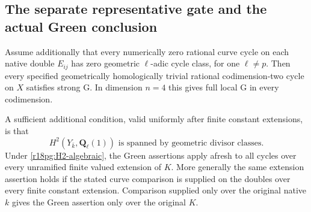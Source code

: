 \subsection{The separate representative gate and the actual Green conclusion}

\begin{corollary}
\label{r18pg:green}
Assume additionally that every numerically zero rational curve cycle
on each native double $E_{ij}$ has zero geometric $\ell$-adic cycle
class, for one $\ell\ne p$.  Then every specified geometrically
homologically trivial rational codimension-two cycle on $X$ satisfies
strong G.  In dimension $n=4$ this gives full local G in every
codimension.

A sufficient additional condition, valid uniformly after finite
constant extensions, is that
\[
     H^2(Y_{\bar k},\mathbf Q_\ell(1))
          \text{ is spanned by geometric divisor classes}.
 \tag{PG18.19}\label{r18pg:H2-algebraic}
\]
Under \eqref{r18pg:H2-algebraic}, the Green assertions apply afresh
to all cycles over every unramified finite valued extension of $K$.
More generally the same extension assertion holds if the stated
curve comparison is supplied on the doubles over every finite
constant extension.  Comparison supplied only over the original
native $k$ gives the Green assertion only over the original $K$.
\end{corollary}

